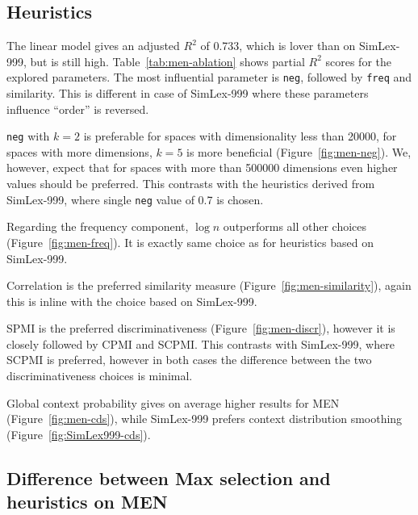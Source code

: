 \subsection{Heuristics}
\label{sec:heuristics-men}


The linear model gives an adjusted $R^2$ of 0.733, which is lover than on SimLex-999, but is still high. Table~\ref{tab:men-ablation} shows partial $R^2$ scores for the explored parameters. The most influential parameter is \texttt{neg}, followed by \texttt{freq} and similarity. This is different in case of SimLex-999 where these parameters influence ``order'' is reversed.


\texttt{neg} with $k = 2$ is preferable for spaces with dimensionality less than 20000, for spaces with more dimensions,
$k = 5$ is more beneficial (Figure~\ref{fig:men-neg}).  We, however, expect that for spaces with more than 500000 dimensions even higher values should be preferred. This contrasts with the heuristics derived from SimLex-999, where single \texttt{neg} value of 0.7 is chosen.

% 
Regarding the frequency component, $\log n$ outperforms all other choices (Figure~\ref{fig:men-freq}). It is exactly same choice as for heuristics based on SimLex-999.


Correlation is the preferred similarity measure (Figure~\ref{fig:men-similarity}), again this is inline with the choice based on SimLex-999.

% 
SPMI is the preferred discriminativeness (Figure~\ref{fig:men-discr}), however it is closely followed by CPMI and SCPMI. This contrasts with SimLex-999, where SCPMI is preferred, however in both cases the difference between the two discriminativeness choices is minimal.


Global context probability gives on average higher results for MEN (Figure~\ref{fig:men-cds}), while SimLex-999 prefers context distribution smoothing (Figure~\ref{fig:SimLex999-cds}).

\subsection{Difference between Max selection and heuristics on MEN}




